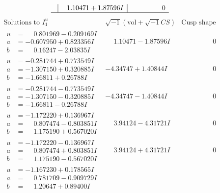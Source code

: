 \documentclass[1p]{elsarticle_modified}
\theoremstyle{definition}
\newcommand{\I}{\sqrt{-1}}
\begin{document}
$$\begin{array}{c|c|c}
 & \phantom{-}1.10471 + 1.87596 I & \phantom{-0.000000 } 0\\
 \hline 
 \end{array}$$\newpage$$\begin{array}{c|c|c}  
\text{Solutions to }I^u_{1}& \I (\text{vol} + \sqrt{-1}CS) & \text{Cusp shape}\\
 \hline 
\begin{aligned}
u &= \phantom{-}0.801969 - 0.209169 I \\
a &= -0.607950 + 0.823356 I \\
b &= \phantom{-}0.16247 - 2.03835 I\end{aligned}
 & \phantom{-}1.10471 - 1.87596 I & \phantom{-0.000000 } 0 \\ \hline\begin{aligned}
u &= -0.281744 + 0.773549 I \\
a &= -1.307150 + 0.320885 I \\
b &= -1.66811 + 0.26788 I\end{aligned}
 & -4.34747 + 1.40844 I & \phantom{-0.000000 } 0 \\ \hline\begin{aligned}
u &= -0.281744 - 0.773549 I \\
a &= -1.307150 - 0.320885 I \\
b &= -1.66811 - 0.26788 I\end{aligned}
 & -4.34747 - 1.40844 I & \phantom{-0.000000 } 0 \\ \hline\begin{aligned}
u &= -1.172220 + 0.136967 I \\
a &= \phantom{-}0.807474 - 0.803851 I \\
b &= \phantom{-}1.175190 + 0.567020 I\end{aligned}
 & \phantom{-}3.94124 - 4.31721 I & \phantom{-0.000000 } 0 \\ \hline\begin{aligned}
u &= -1.172220 - 0.136967 I \\
a &= \phantom{-}0.807474 + 0.803851 I \\
b &= \phantom{-}1.175190 - 0.567020 I\end{aligned}
 & \phantom{-}3.94124 + 4.31721 I & \phantom{-0.000000 } 0 \\ \hline\begin{aligned}
u &= -1.167230 + 0.178565 I \\
a &= \phantom{-}0.781709 - 0.909729 I \\
b &= \phantom{-}1.20647 + 0.89400 I\end{aligned}

\end{array}$$
\end{document}

